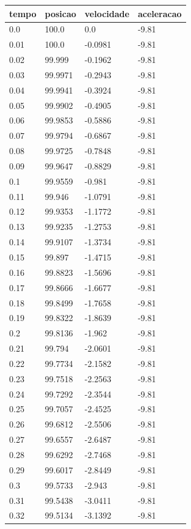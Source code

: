 \begin{tabular}{llll}
\toprule
tempo & posicao & velocidade & aceleracao \\
\midrule
0.0 & 100.0 & 0.0 & -9.81 \\
0.01 & 100.0 & -0.0981 & -9.81 \\
0.02 & 99.999 & -0.1962 & -9.81 \\
0.03 & 99.9971 & -0.2943 & -9.81 \\
0.04 & 99.9941 & -0.3924 & -9.81 \\
0.05 & 99.9902 & -0.4905 & -9.81 \\
0.06 & 99.9853 & -0.5886 & -9.81 \\
0.07 & 99.9794 & -0.6867 & -9.81 \\
0.08 & 99.9725 & -0.7848 & -9.81 \\
0.09 & 99.9647 & -0.8829 & -9.81 \\
0.1 & 99.9559 & -0.981 & -9.81 \\
0.11 & 99.946 & -1.0791 & -9.81 \\
0.12 & 99.9353 & -1.1772 & -9.81 \\
0.13 & 99.9235 & -1.2753 & -9.81 \\
0.14 & 99.9107 & -1.3734 & -9.81 \\
0.15 & 99.897 & -1.4715 & -9.81 \\
0.16 & 99.8823 & -1.5696 & -9.81 \\
0.17 & 99.8666 & -1.6677 & -9.81 \\
0.18 & 99.8499 & -1.7658 & -9.81 \\
0.19 & 99.8322 & -1.8639 & -9.81 \\
0.2 & 99.8136 & -1.962 & -9.81 \\
0.21 & 99.794 & -2.0601 & -9.81 \\
0.22 & 99.7734 & -2.1582 & -9.81 \\
0.23 & 99.7518 & -2.2563 & -9.81 \\
0.24 & 99.7292 & -2.3544 & -9.81 \\
0.25 & 99.7057 & -2.4525 & -9.81 \\
0.26 & 99.6812 & -2.5506 & -9.81 \\
0.27 & 99.6557 & -2.6487 & -9.81 \\
0.28 & 99.6292 & -2.7468 & -9.81 \\
0.29 & 99.6017 & -2.8449 & -9.81 \\
0.3 & 99.5733 & -2.943 & -9.81 \\
0.31 & 99.5438 & -3.0411 & -9.81 \\
0.32 & 99.5134 & -3.1392 & -9.81 \\

\end{tabular}
